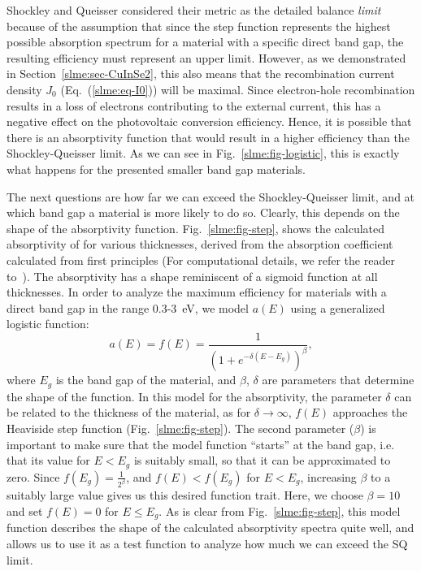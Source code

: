 \begin{refsection}
Shockley and Queisser considered their metric as the detailed balance 
\textit{limit} because of the assumption that since the step function 
represents the highest possible absorption spectrum for a material with a 
specific direct band gap, the resulting efficiency must represent an upper 
limit. However, as we demonstrated in Section~\ref{slme:sec-CuInSe2}, this 
also means that the recombination current density $J_0$ 
(Eq.~(\ref{slme:eq-I0})) will be maximal. Since electron-hole recombination 
results in a loss of electrons contributing to the external current, this has 
a negative effect on the photovoltaic conversion efficiency. Hence, it is 
possible that there is an absorptivity function that would result in a higher 
efficiency than the Shockley-Queisser limit. As we can see in 
Fig.~\ref{slme:fig-logistic}, this is exactly what happens for the presented 
smaller band gap materials. 
 
The next questions are how far we can exceed the Shockley-Queisser limit, and 
at which band gap a material is more likely to do so. Clearly, this depends on the shape of the absorptivity function. Fig.~\ref{slme:fig-step}, 
shows the calculated absorptivity of  for various thicknesses, 
derived from the absorption coefficient calculated from first principles (For 
computational details, we refer the reader to~\cite{Sarmadian2016}). 
The absorptivity has a shape reminiscent of a sigmoid function at all thicknesses. In 
order to analyze the maximum efficiency for materials with a direct band gap 
in the range 0.3-3~\si{\electronvolt}, we model $a(E)$ using a generalized 
logistic function: 
\begin{equation} 
a(E) = f(E) = \frac{1}{(1+e^{-\delta (E - E_g)})^{\beta}}, 
\end{equation} 
where $E_g$ is the band gap of the material, and $\beta$, $\delta$ are 
parameters that determine the shape of the function. In this model for the 
absorptivity, the parameter $\delta$ can be related to the thickness of the 
material, as for $\delta\rightarrow\infty$, $f(E)$ approaches the Heaviside 
step function (Fig.~\ref{slme:fig-step}). The second parameter ($\beta$) is 
important to make sure that the model function ``starts'' at the band gap, 
i.e. that its value for $E < E_g$ is suitably small, so that it can be 
approximated to zero. Since $f(E_g) = \frac{1}{2^\beta}$, and $f(E) < f(E_g)$ 
for $E < E_g$, increasing $\beta$ to a suitably large value gives us this 
desired function trait. Here, we choose $\beta = 10$ and set $f(E) = 0$ for $E 
\leq E_g$. As is clear from Fig.~\ref{slme:fig-step}, this model function 
describes the shape of the calculated absorptivity spectra quite well, and 
allows us to use it as a test function to analyze how much we can exceed the 
SQ limit. 
 

\end{refsection}
